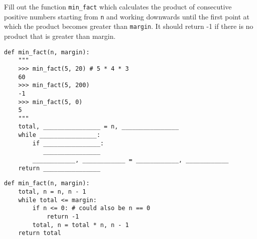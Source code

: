 \question Fill out the function \lstinline{min_fact} which calculates the product of consecutive positive numbers starting from \lstinline{n} and working downwards until the first point at which the product becomes greater than \lstinline{margin}. It should return -1 if there is no product that is greater than margin.

\begin{blocksection}
\begin{lstlisting}
def min_fact(n, margin):
    """
    >>> min_fact(5, 20) # 5 * 4 * 3
    60
    >>> min_fact(5, 200)
    -1
    >>> min_fact(5, 0)
    5
    """
    total, ________________ = n, ________________
    while ________________:
        if ________________:
           ________________
        ____________, ____________ = ____________, ____________
    return ________________

\end{lstlisting}
\end{blocksection}

\begin{blocksection}
\begin{solution}
\begin{lstlisting}
def min_fact(n, margin):
    total, n = n, n - 1
    while total <= margin:
        if n <= 0: # could also be n == 0
            return -1
        total, n = total * n, n - 1
    return total
\end{lstlisting}
\end{solution}
\end{blocksection}